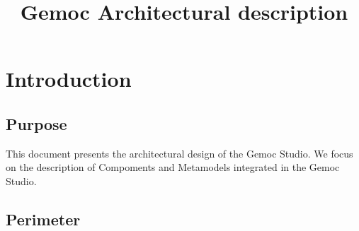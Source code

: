 \documentclass{gemoc} %
\title{Gemoc Architectural description}
\begin{document}
\maketitle

\begin{revisions}
	\begin{revtable}
		\dates{}{}{}{}{}
		\writers{}{}{}{}{}
		\approvers{}{}{}{}{}
	\end{revtable}
	\begin{revisionlabels}
		\revlabel{}
	\end{revisionlabels}
\end{revisions}

\begin{tableofauthors}
\end{tableofauthors}

\tableofcontents
\newpage

\chapter{Introduction}


\section{Purpose}
This document presents the architectural design of the Gemoc Studio. We focus on 
the description of  Compoments and Metamodels integrated in the Gemoc Studio.

\section{Perimeter}

\end{document}
